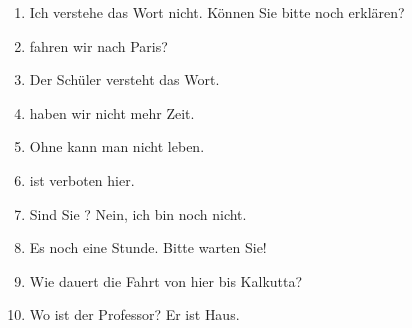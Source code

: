 \documentclass[12pt]{article}
\begin{document}
\begin{enumerate}
    \item Ich verstehe das Wort nicht. Können Sie bitte noch \underline{\hspace{2cm}} erklären?
    \item \underline{\hspace{2cm}} fahren wir nach Paris?
    \item Der Schüler versteht das Wort\underline{\hspace{2cm}}.
    \item \underline{\hspace{2cm}} haben wir nicht mehr Zeit.
    \item Ohne \underline{\hspace{2cm}} kann man nicht leben.
    \item \underline{\hspace{2cm}} ist verboten hier.
    \item Sind Sie \underline{\hspace{2cm}}? Nein, ich bin noch nicht.
    \item Es\underline{\hspace{2cm}} noch eine Stunde. Bitte warten Sie!
    \item Wie\underline{\hspace{2cm}} dauert die Fahrt von hier bis Kalkutta?
    \item Wo ist der Professor? Er ist \underline{\hspace{2cm}} Haus.
\end{enumerate}
\end{document}
